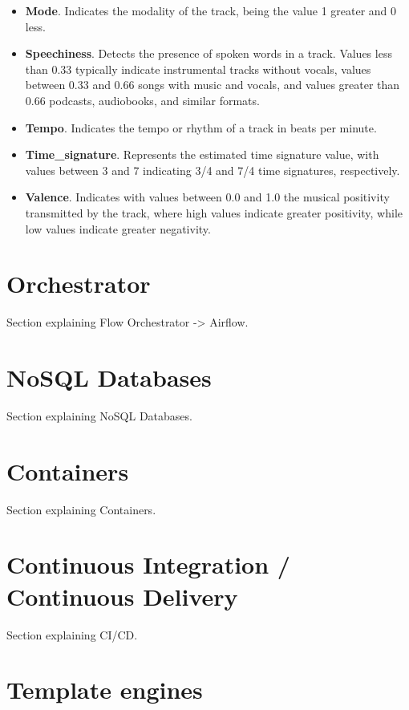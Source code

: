 \begin{itemize}
\begin{itemize}
		\item \textbf{Mode}. Indicates the modality of the track, being the value 1 greater and 0 less.
		\item \textbf{Speechiness}. Detects the presence of spoken words in a track. Values less than 0.33 typically indicate instrumental tracks without vocals, values between 0.33 and 0.66 songs with music and vocals, and values greater than 0.66 podcasts, audiobooks, and similar formats.
		\item \textbf{Tempo}. Indicates the tempo or rhythm of a track in beats per minute.
		\item \textbf{Time\_signature}. Represents the estimated time signature value, with values between 3 and 7 indicating 3/4 and 7/4 time signatures, respectively.
		\item \textbf{Valence}. Indicates with values between 0.0 and 1.0 the musical positivity transmitted by the track, where high values indicate greater positivity, while low values indicate greater negativity.
	\end{itemize}
\end{itemize}

\section{Orchestrator}

\nonzeroparskip Section explaining Flow Orchestrator -> Airflow.

\section{NoSQL Databases}

\nonzeroparskip Section explaining NoSQL Databases.

\section{Containers}

\nonzeroparskip Section explaining Containers.

\section{Continuous Integration / Continuous Delivery}

\nonzeroparskip Section explaining CI/CD.

\section{Template engines}


